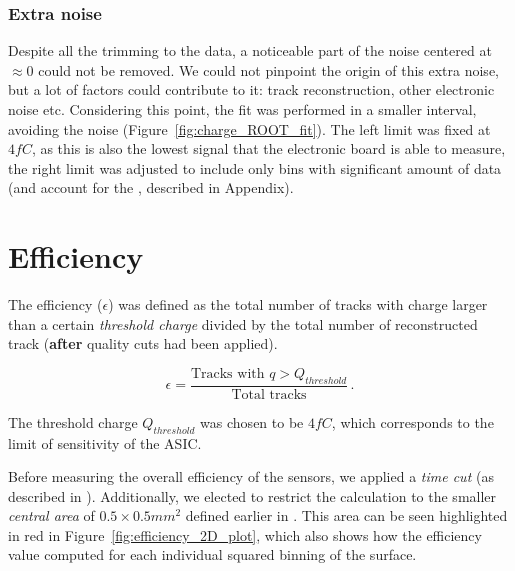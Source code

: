 \subsubsection{Extra noise}
Despite all the trimming to the data, a noticeable part of the noise centered at \(\approx 0\) could not be removed. We could not pinpoint the origin of this extra noise, but a lot of factors could contribute to it: track reconstruction, other electronic noise etc.
Considering this point, the fit was performed in a smaller interval, avoiding the noise (Figure~\ref{fig:charge_ROOT_fit}). The left limit was fixed at \(4\si{fC}\), as this is also the lowest signal that the electronic board is able to measure, the right limit was adjusted to include only bins with significant amount of data (and account for the , described in Appendix).



\section{Efficiency}\label{sec:methods_efficiency}

The efficiency (\(\epsilon\)) was defined as the total number of tracks with charge larger than a certain \textit{threshold charge} divided by the total number of reconstructed track (\textbf{after} quality cuts had been applied).


\begin{equation*}
    \epsilon = \frac{\text{Tracks with } q>Q_{threshold}}{\text{Total tracks}}  \, .
\end{equation*}

The threshold charge \(Q_{threshold}\) was chosen to be \(4\si{fC}\), which corresponds to the limit of sensitivity of the ASIC.

Before measuring the overall efficiency of the sensors, we applied a \textit{time cut} (as described in ). Additionally, we elected to restrict the calculation to the smaller \textit{central area} of \(0.5\times0.5\si{mm^2}\) defined earlier in . This area can be seen highlighted in red in Figure~\ref{fig:efficiency_2D_plot}, which also shows how the efficiency value computed for each individual squared binning of the surface.

